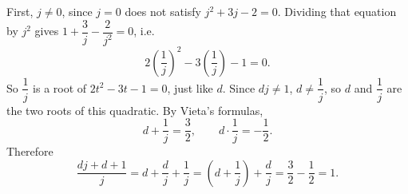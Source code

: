 First, $j\ne0$, since $j=0$ does not satisfy $j^2+3j-2=0$. Dividing that equation by $j^2$ gives $1+\dfrac3j-\dfrac2{j^2}=0$, i.e.
\[2\left(\dfrac1j\right)^2-3\left(\dfrac1j\right)-1=0.\]
So $\dfrac1j$ is a root of $2t^2-3t-1=0$, just like $d$. Since $dj\ne1$, $d\ne\dfrac1j$, so $d$ and $\dfrac1j$ are the two roots of this quadratic. By Vieta's formulas,
\[d+\dfrac1j=\dfrac32,\qquad d\cdot\dfrac1j=-\dfrac12.\]
Therefore
\[\dfrac{dj+d+1}{j}=d+\dfrac dj+\dfrac1j=\left(d+\dfrac1j\right)+\dfrac dj=\dfrac32-\dfrac12=\boxed{1}.\]
